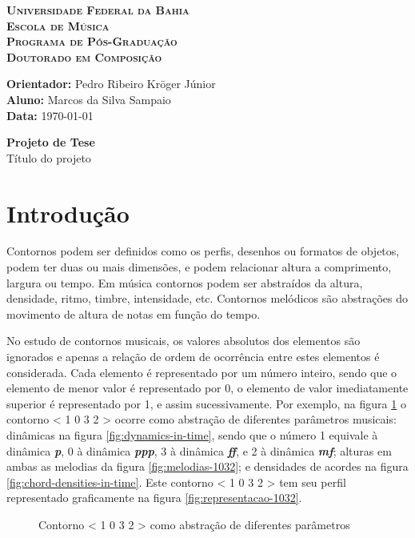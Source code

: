 \documentclass[12pt]{article}
\newcommand{\cabecalho}[0]{
  \textbf{\textsc{Universidade Federal da Bahia}} \\
  \textbf{\textsc{Escola de Música}} \\
  \textbf{\textsc{Programa de Pós-Graduação}} \\
  \textbf{\textsc{Doutorado em Composição}} \par
  \vspace*{1ex}
  \textbf{Orientador:} Pedro Ribeiro Kröger Júnior\\
  \textbf{Aluno: } Marcos da Silva Sampaio \\
  \textbf{Data: } \today
  \thispagestyle{empty}
}
\newcommand{\titulo}[1]{
  \vspace{1cm}
  \begin{center}{
      \Huge \textbf{Projeto de Tese} \\
    }
    \vspace{12pt}
    {\Large #1}
  \end{center}
  \vspace{1cm}
}
\begin{document}
\cabecalho
\titulo{Título do projeto}


\section{Introdução}
\label{sec:introducao}



Contornos podem ser definidos como os perfis, desenhos ou formatos de
objetos, podem ter duas ou mais dimensões, e podem relacionar altura a
comprimento, largura ou tempo. Em música contornos podem ser
abstraídos da altura, densidade, ritmo, timbre, intensidade,
etc. Contornos melódicos são abstrações do movimento de altura de
notas em função do tempo.

No estudo de contornos musicais, os valores absolutos dos elementos
são ignorados e apenas a relação de ordem de ocorrência entre estes
elementos é considerada. Cada elemento é representado por um número
inteiro, sendo que o elemento de menor valor é representado por 0, o
elemento de valor imediatamente superior é representado por 1, e assim
sucessivamente. Por exemplo, na figura \ref{fig:representacoes} o
contorno < 1 0 3 2 > ocorre como abstração de diferentes parâmetros
musicais: dinâmicas na figura \ref{fig:dynamics-in-time}, sendo que o
número 1 equivale à dinâmica \textbf{\textit{p}}, 0 à dinâmica
\textbf{\textit{ppp}}, 3 à dinâmica \textbf{\textit{ff}}, e 2 à
dinâmica \textbf{\textit{mf}}; alturas em ambas as melodias da figura
\ref{fig:melodias-1032}; e densidades de acordes na figura
\ref{fig:chord-densities-in-time}. Este contorno < 1 0 3 2 > tem seu
perfil representado graficamente na figura
\ref{fig:representacao-1032}.

\begin{figure}[h]
  \centering
  \quad

  \subfloat[Altura]{
    \texttt{[image: ly-1032]}
    \label{fig:melodias-1032}
  }
  \caption{Contorno < 1 0 3 2 > como abstração de diferentes
    parâmetros}
  \label{fig:representacoes}
\end{figure}
\end{document}
